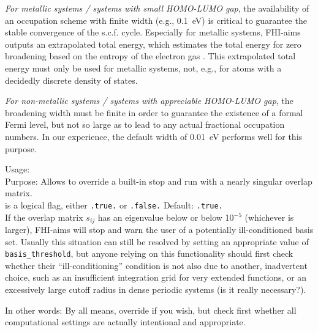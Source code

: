 \emph{For metallic systems / systems with small HOMO-LUMO gap}, the availability
of an occupation scheme with finite width (e.g., 0.1~eV) is critical to
guarantee the stable convergence of the s.c.f. cycle. Especially for metallic
systems, FHI-aims outputs an extrapolated total energy, which estimates the
total energy for zero broadening based on the entropy of the electron gas
\cite{Kre96,Gillan89,Wagner98}. This extrapolated total energy must only be used
for metallic systems, not, e.g., for atoms with a decidedly discrete density of
states.

\emph{For non-metallic systems / systems with appreciable HOMO-LUMO gap}, the
broadening width must be finite in order to guarantee the existence of a formal
Fermi level, but not so large as to lead to any actual fractional occupation
numbers. In our experience, the default width of 0.01~eV performs well for this
purpose.

{
  \noindent
  Usage:   \\[1.0ex]
  Purpose: Allows to override a built-in stop and run with a nearly singular
    overlap matrix. \\[1.0ex]
   is a logical flag, either \texttt{.true.} or \texttt{.false.}
    Default: \texttt{.true.} \\
}
If the overlap matrix $s_{ij}$ has an eigenvalue below
 or below 10$^{-5}$ (whichever is larger), FHI-aims
will stop and warn the user of a potentially ill-conditioned basis set. Usually
this situation can still be resolved by setting an appropriate value of
\texttt{basis\_threshold}, but anyone relying on this functionality should first
check whether their ``ill-conditioning'' condition is not also due to another,
inadvertent choice, such as an insufficient integration grid for very extended
functions, or an excessively large cutoff radius in dense periodic systems (is
it really necessary?).

In other words: By all means, override if you wish, but check first whether all
computational settings are actually intentional and appropriate.
